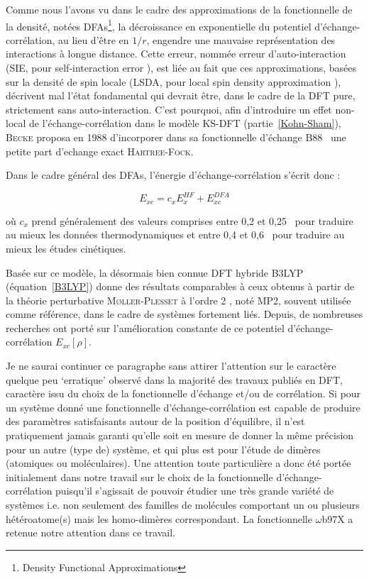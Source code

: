 Comme nous l'avons vu dans le cadre des approximations de la fonctionnelle de la densité, notées DFAs\footnote{\og Density Functional Approximations \fg{} }, la décroissance en exponentielle du potentiel d'échange-corrélation, au lieu d'être en $1/r$, engendre une mauvaise représentation des interactions à longue distance. Cette erreur, nommée erreur d'auto-interaction (SIE, pour \og self-interaction error \fg{}), est liée au fait que ces approximations, basées sur la densité de spin locale (LSDA, pour \og local spin density approximation \fg{}), décrivent mal l'état fondamental qui devrait être, dans le cadre de la DFT pure, strictement sans auto-interaction.     
C'est pourquoi, afin d'introduire un effet non-local de l'échange-corrélation dans le modèle KS-DFT (partie~\ref{Kohn-Sham}), \textsc{Becke} proposa en 1988 d'incorporer dans sa fonctionnelle d'échange B88~\cite{becke1988density} une petite part d'echange exact \textsc{Hartree-Fock}. 

Dans le cadre général des DFAs, l'énergie d'échange-corrélation s'écrit donc :

\begin{equation}
E_{xc} = c_{x}E_{x}^{HF} + E_{xc}^{DFA}
\label{xcB88}
\end{equation}

\noindent où $c_{x}$ prend généralement des valeurs comprises entre 0,2 et 0,25~\cite{becke1993density} pour traduire au mieux les données thermodynamiques et entre 0,4 et 0,6~\cite{boese2004development} pour traduire au mieux les études cinétiques.

Basée sur ce modèle, la désormais bien connue DFT hybride B3LYP \cite{becke1993density} (équation~\ref{B3LYP}) donne des résultats comparables à ceux obtenus à partir de la théorie perturbative \textsc{M\o ller-Plesset} à l'ordre 2 \cite{moller1934note}, noté MP2, souvent utilisée comme référence, dans le cadre de systèmes fortement liés. Depuis, de nombreuses recherches ont porté sur l'amélioration constante de ce potentiel d'échange-corrélation $E_{xc}[\rho]$.

Je ne saurai continuer ce paragraphe sans attirer l’attention sur le caractère quelque peu ‘erratique’ observé dans la majorité des travaux publiés en DFT, caractère issu du choix de la fonctionnelle d’échange et/ou de corrélation. Si pour un système donné une fonctionnelle d’échange-corrélation est capable de produire des paramètres satisfaisants autour de la position d’équilibre, il n’est pratiquement jamais garanti qu’elle soit en mesure de donner la même précision pour un autre (type de) système, et qui plus est pour l’étude de dimères (atomiques ou moléculaires). Une attention toute particulière a donc été portée initialement dans notre travail sur le choix de la fonctionnelle d’échange-corrélation puisqu’il s’agissait de pouvoir étudier une très grande variété de systèmes i.e. non seulement des familles de molécules comportant un ou plusieurs hétéroatome(s) mais les homo-dimères correspondant. La fonctionnelle $\omega$b97X a retenue notre attention dans ce travail.


